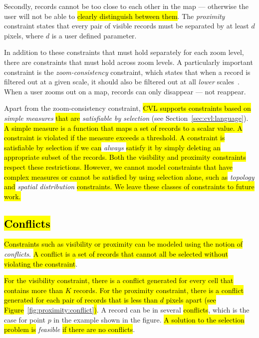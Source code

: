 Secondly, records cannot be too close to each other in the map --- otherwise the user will not be able to \hl{clearly distinguish between them}. The \emph{proximity} constraint states that every pair of visible records must be separated by at least $d$ pixels, where $d$ is a user defined parameter.

In addition to these constraints that must hold separately for each zoom level, there are constraints that must hold across zoom levels. A particularly important constraint is the \emph{zoom-consistency} constraint, which states that when a record is filtered out at a given scale, it should also be filtered out at all \emph{lower} scales~\cite{sarma2012fusiontables}. When a user zooms out on a map, records can only disappear --- not reappear.

Apart from the zoom-consistency constraint, \hl{CVL supports constraints based on }\emph{simple measures}\hl{ that are }\emph{satisfiable by selection} (see Section~\ref{sec:cvl:language}).\hl{ A simple measure is a function that maps a set of records to a scalar value. A constraint is violated if the measure exceeds a threshold. A constraint is satisfiable by selection if we can }\emph{always}\hl{ satisfy it by simply deleting an appropriate subset of the records. Both the visibility and proximity constraints respect these restrictions. However, we cannot model constraints that have complex measures or cannot be satisfied by using selection alone, such as }\emph{topology}\hl{ and }\emph{spatial distribution}\hl{ constraints. We leave these classes of constraints to future work.}

\subsection{\hl{Conflicts}}
\label{sec:conflicts}

\hl{Constraints such as visibility or proximity can be modeled using the notion of }\emph{conflicts}. \hl{A conflict is a set of records that cannot all be selected without violating the constraint}.

\hl{For the visibility constraint, there is a conflict generated for every cell that contains more than $K$ records. For the proximity constraint, there is a conflict generated for each pair of records that is less than $d$ pixels apart (see Figure}~\ref{fig:proximity:conflict}\hl{)}. A record can be in several \hl{conflicts}, which is the case for point $p$ in the example shown in the figure. \hl{A solution to the selection problem is }\emph{feasible}\hl{ if there are no conflicts}.

